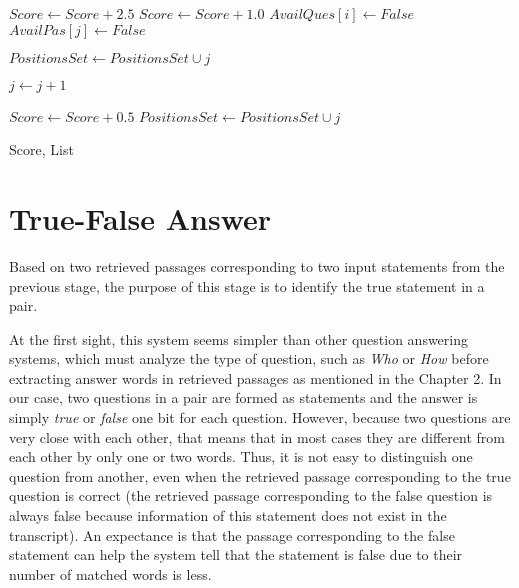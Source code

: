 \begin{algorithm}
\begin{algorithmic} [1]
		\STATE $Score \gets Score + 2.5$ 
		\ELSE 
		\STATE $Score \gets Score + 1.0$ 
		\ENDIF
		\STATE $AvailQues[i] \gets False$  
		\STATE $AvailPas[j] \gets False $ 
				
		\STATE $PositionsSet \gets PositionsSet \cup j$ 
	\ENDIF

		
	\STATE $j \gets j+1$
	\ENDWHILE
\ENDFOR

\STATE{}
			\STATE $Score \gets Score + 0.5$
			\STATE $PositionsSet \gets PositionsSet \cup j$ 
		\ENDIF
	\ENDFOR
\ENDFOR

\RETURN Score, List
\end{algorithmic}
\end{algorithm}

\newpage
\normalsize




\newpage

\section{True-False Answer}

Based on two retrieved passages corresponding to two input statements from the previous stage, the purpose of this stage is to identify the true statement in a pair. 

At the first sight, this system seems simpler than other question answering systems, which must analyze the type of question, such as \textit{Who} or \textit{How} before extracting answer words in retrieved passages as mentioned in the Chapter 2. In our case, two questions in a pair are formed as statements and the answer is simply \textit{true} or \textit{false} one bit for each question. However, because two questions are very close with each other, that means that in most cases they are different from each other by only one or two words. Thus, it is not easy to distinguish one question from another, even when the retrieved passage corresponding to the true question is correct (the retrieved passage corresponding to the false question is always false because information of this statement does not exist in the transcript). An expectance is that the passage corresponding to the false statement can help the system tell that the statement is false due to their number of matched words is less.

